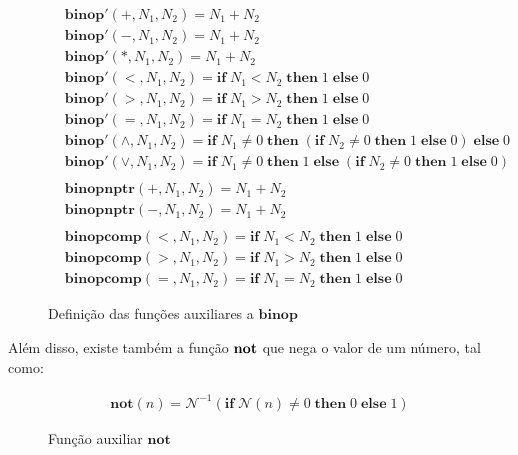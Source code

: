 \begin{figure}[ht]
	\begin{align}
		& \mathbf{binop}'(+, N_1, N_2) = N_1 + N_2 \label{fig:def:binop1}\\
		& \mathbf{binop}'(-, N_1, N_2) = N_1 + N_2\\
		& \mathbf{binop}'(*, N_1, N_2) = N_1 + N_2\\
		& \mathbf{binop}'(<, N_1, N_2) = \mathbf{if}\; N_1 < N_2 \;\mathbf{then}\; 1 \;\mathbf{else} \;0\\
		& \mathbf{binop}'(>, N_1, N_2) = \mathbf{if}\; N_1 > N_2 \;\mathbf{then}\; 1 \;\mathbf{else} \;0\\
		& \mathbf{binop}'(=, N_1, N_2) = \mathbf{if}\; N_1 = N_2 \;\mathbf{then}\; 1 \;\mathbf{else} \;0\\
		& \mathbf{binop}'(\land, N_1, N_2) = \mathbf{if}\; N_1 \neq 0 \;\mathbf{then}\; (\mathbf{if}\; N_2 \neq 0 \;\mathbf{then}\; 1 \;\mathbf{else} \;0) \;\mathbf{else} \;0\\
		& \mathbf{binop}'(\lor, N_1, N_2) = \mathbf{if}\; N_1 \neq 0 \;\mathbf{then}\; 1 \;\mathbf{else} \;(\mathbf{if}\; N_2 \neq 0 \;\mathbf{then}\; 1 \;\mathbf{else} \;0) \label{fig:def:binop2}\\
		\nonumber \\
		& \mathbf{binopnptr}(+, N_1, N_2) = N_1 + N_2  \label{fig:def:binop3}\\
		& \mathbf{binopnptr}(-, N_1, N_2) = N_1 + N_2  \label{fig:def:binop4}\\
		\nonumber \\
		& \mathbf{binopcomp}(<, N_1, N_2) = \mathbf{if}\; N_1 < N_2 \;\mathbf{then}\; 1 \;\mathbf{else} \;0  \label{fig:def:binop5}\\
		& \mathbf{binopcomp}(>, N_1, N_2) = \mathbf{if}\; N_1 > N_2 \;\mathbf{then}\; 1 \;\mathbf{else} \;0  \label{fig:def:binop6}\\
		& \mathbf{binopcomp}(=, N_1, N_2) = \mathbf{if}\; N_1 = N_2 \;\mathbf{then}\; 1 \;\mathbf{else} \;0  \label{fig:def:binop7}
	\end{align}
	\caption{Definição das funções auxiliares a $\mathbf{binop}$}
	\label{fig:def:binop:extra}
\end{figure}
\FloatBarrier

Além disso, existe também a função $\mathbf{not}$ que nega o valor de um número, tal como: 
\begin{figure}[ht]
	\begin{align}
		\mathbf{not}(n) = \mathcal{N}^{-1}(\mathbf{if}\; \mathcal{N}(n) \neq 0 \;\mathbf{then}\; 0 \;\mathbf{else} \;1)
	\end{align}
	\caption{Função auxiliar $\mathbf{not}$}
	\label{fig:def:not}
\end{figure}
\FloatBarrier

